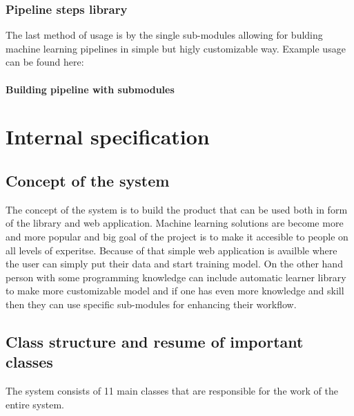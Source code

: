\documentclass[a4paper,twoside,12pt]{book}
\begin{document}
\subsection{Pipeline steps library}

The last method of usage is by the single sub-modules allowing for bulding machine learning pipelines in simple but higly customizable way.
Example usage can be found here:

\subsubsection{Building pipeline with submodules}


\chapter{Internal specification}

\section{Concept of the system}

The concept of the system is to build the product that can be used both in form of the library and web application. Machine learning solutions are become more and more popular and big goal of the project is to make it accesible to people on all levels of experitse. 
Because of that simple web application is availble where the user can simply put their data and start training model. On the other hand person with some programming knowledge can include automatic learner library to make more customizable model and if one has even more knowledge and skill then they can use specific sub-modules for enhancing their workflow.

\section{Class structure and resume of important classes}

The system consists of 11 main classes that are responsible for the work of the entire system. 
\end{document}
